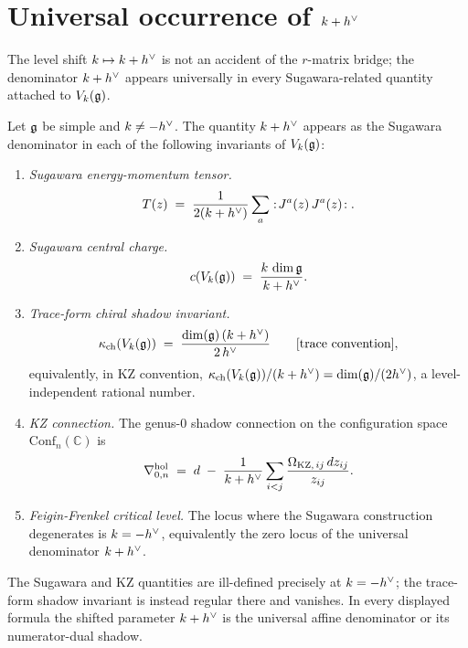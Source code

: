 \section{Universal occurrence of $k + h^{\vee}$}
\label{sec:universal-occurrence}

The level shift $k \mapsto k + h^{\vee}$ is not an accident of the
$r$-matrix bridge; the denominator $k + h^{\vee}$ appears universally in
every Sugawara-related quantity attached to $V_k(\mathfrak{g})$.

\begin{proposition}
\label{prop:shift-appears-universally}
\ClaimStatusProvedHere
Let $\mathfrak{g}$ be simple and $k \neq -h^{\vee}$. The quantity $k + h^{\vee}$ appears
as the Sugawara denominator in each of the following invariants of
$V_k(\mathfrak{g})$:
\begin{enumerate}
 \item \emph{Sugawara energy-momentum tensor.}
 \[
 T(z) \;=\; \frac{1}{2(k + h^{\vee})}
 \sum_{a} :\!J^a(z)\,J^a(z)\!:.
 \]
 \item \emph{Sugawara central charge.}
 \[
 c(V_k(\mathfrak{g})) \;=\; \frac{k\,\dim \mathfrak{g}}{k + h^{\vee}}.
 \]
 \item \emph{Trace-form chiral shadow invariant.}
 \[
 \kappa_{\mathrm{ch}}(V_k(\mathfrak{g})) \;=\; \frac{\dim(\mathfrak{g})\,(k + h^{\vee})}{2\,h^{\vee}}
 \qquad\text{[trace convention]},
 \]
 equivalently, in KZ convention,
 $\kappa_{\mathrm{ch}}(V_k(\mathfrak{g}))/(k + h^{\vee}) = \dim(\mathfrak{g})/(2h^{\vee})$, a
 level-independent rational number.
 \item \emph{KZ connection.} The genus-$0$ shadow connection on the
 configuration space $\mathrm{Conf}_n(\mathbb{C})$ is
 \[
 \nabla^{\mathrm{hol}}_{0,n}
 \;=\; d
 \;-\; \frac{1}{k + h^{\vee}}\sum_{i < j}
 \frac{\Omega_{\mathrm{KZ},\,ij}\,dz_{ij}}{z_{ij}}.
 \]
 \item \emph{Feigin-Frenkel critical level.} The locus where the
 Sugawara construction degenerates is $k = -h^{\vee}$, equivalently the
 zero locus of the universal denominator $k + h^{\vee}$.
\end{enumerate}
The Sugawara and KZ quantities are ill-defined precisely at
$k = -h^{\vee}$; the trace-form shadow invariant is instead regular there
and vanishes. In every displayed formula the shifted parameter
$k + h^{\vee}$ is the universal affine denominator or its numerator-dual
shadow.
\end{proposition}


